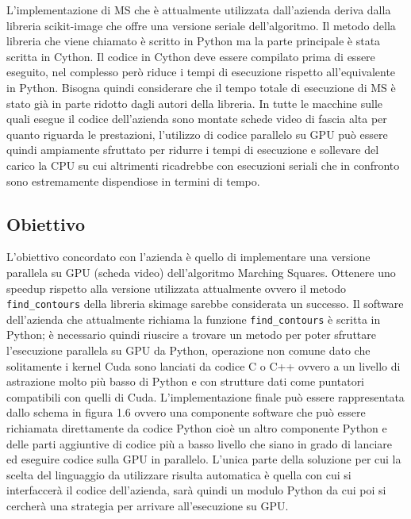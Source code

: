 \documentclass[12pt,a4paper]{report}
\begin{document}
L’implementazione di MS che è attualmente utilizzata dall’azienda deriva dalla libreria scikit-image che offre una versione seriale dell’algoritmo. Il metodo della libreria che viene chiamato è scritto in Python ma la parte principale è stata scritta in Cython.
Il codice in Cython deve essere compilato prima di essere eseguito, nel complesso però riduce i tempi di esecuzione rispetto all’equivalente in Python. Bisogna quindi considerare che il tempo totale di esecuzione di MS è stato già in parte ridotto dagli autori della libreria. \newline
In tutte le macchine sulle quali esegue il codice dell'azienda sono montate schede video di fascia alta per quanto riguarda le prestazioni, l'utilizzo di codice parallelo su GPU può essere quindi ampiamente sfruttato per ridurre i tempi di esecuzione e sollevare del carico la CPU su cui altrimenti ricadrebbe con esecuzioni seriali che in confronto sono estremamente dispendiose in termini di tempo.

\subsection{Obiettivo}
L'obiettivo concordato con l'azienda è quello di implementare una versione parallela su GPU (scheda video) dell'algoritmo Marching Squares. Ottenere uno speedup rispetto alla versione utilizzata attualmente ovvero il metodo \verb|find_contours| della libreria skimage sarebbe considerata un successo. \newline
Il software dell'azienda che attualmente richiama la funzione \verb|find_contours| è scritta in Python; è necessario quindi riuscire a trovare un metodo per poter sfruttare l'esecuzione parallela su GPU da Python, operazione non comune dato che solitamente i kernel Cuda sono lanciati da codice C o C++ ovvero a un livello di astrazione molto più basso di Python e con strutture dati come puntatori compatibili con quelli di Cuda. \newline
L'implementazione finale può essere rappresentata dallo schema in figura 1.6 ovvero una componente software che può essere richiamata direttamente da codice Python cioè un altro componente Python e delle parti aggiuntive di codice più a basso livello che siano in grado di lanciare ed eseguire codice sulla GPU in parallelo. L'unica parte della soluzione per cui la scelta del linguaggio da utilizzare risulta automatica è quella con cui si interfaccerà il codice dell'azienda, sarà quindi un modulo Python da cui poi si cercherà una strategia per arrivare all'esecuzione su GPU. \newline
\end{document}
